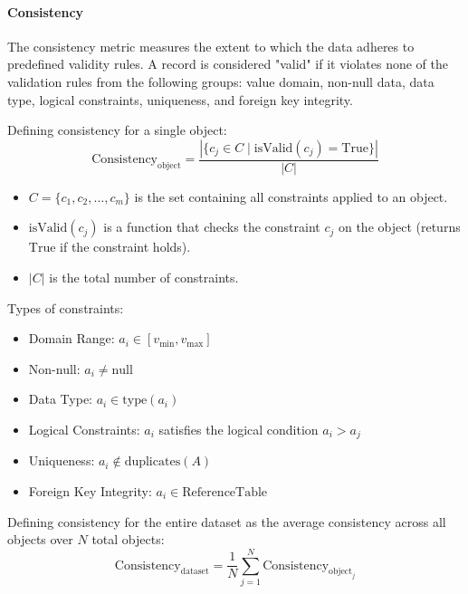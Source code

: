 \documentclass{ieeeaccess}
\begin{document}
\paragraph*{Consistency}

The consistency metric \cite{nguyen2025data_quality} measures the extent to which the data adheres to predefined validity rules. A record is considered "valid" if it violates none of the validation rules from the following groups: value domain, non-null data, data type, logical constraints, uniqueness, and foreign key integrity.

Defining consistency for a single object:
\begin{equation}
\text{Consistency}_{\text{object}} = \frac{|\{c_j \in C \mid \text{isValid}(c_j) = \text{True}\}|}{|C|}
\end{equation}


\begin{itemize}
    \item \( C = \{c_1, c_2, \ldots, c_m\} \) is the set containing all constraints applied to an object.
    \item \(\text{isValid}(c_j)\) is a function that checks the constraint \( c_j \) on the object (returns \(\text{True}\) if the constraint holds).
    \item \( |C| \) is the total number of constraints.
\end{itemize}

Types of constraints:
\begin{itemize}
    \item Domain Range: \( a_i \in [v_{\text{min}}, v_{\text{max}}] \)
    \item Non-null: \( a_i \neq \text{null} \)
    \item Data Type: \( a_i \in \text{type}(a_i) \)
    \item Logical Constraints: \( a_i \) satisfies the logical condition \( a_i > a_j \)
    \item Uniqueness: \( a_i \notin \text{duplicates}(A) \)
    \item Foreign Key Integrity: \( a_i \in \text{ReferenceTable} \)
\end{itemize}

Defining consistency for the entire dataset as the average consistency across all objects over \( N \) total objects:
\begin{equation}
\text{Consistency}_{\text{dataset}} = \frac{1}{N} \sum_{j=1}^{N} \text{Consistency}_{\text{object}_j}
\end{equation}
\end{document}

